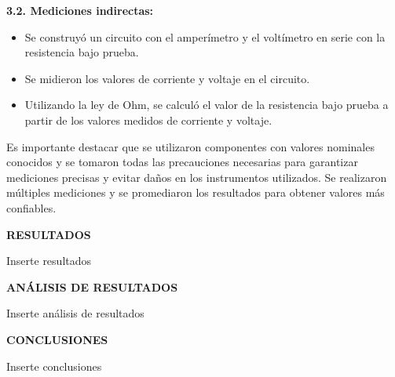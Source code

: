 \documentclass[12pt]{article}
\begin{document}
\begin{enumerate}
		\textbf{3.2. Mediciones indirectas:}
		
		\begin{itemize}
			\item Se construyó un circuito con el amperímetro y el voltímetro en serie con la resistencia bajo prueba.
			\item Se midieron los valores de corriente y voltaje en el circuito.
			\item Utilizando la ley de Ohm, se calculó el valor de la resistencia bajo prueba a partir de los valores medidos de corriente y voltaje.
		\end{itemize}
		
	\end{enumerate}
	
	Es importante destacar que se utilizaron componentes con valores nominales conocidos y se tomaron todas las precauciones necesarias para garantizar mediciones precisas y evitar daños en los instrumentos utilizados. Se realizaron múltiples mediciones y se promediaron los resultados para obtener valores más confiables.

	\newpage
	
	\begin{center}
		\textbf{\large RESULTADOS}\\
	\end{center}
	
	Inserte resultados
	
	\newpage
	
	\begin{center}
		\textbf{\large ANÁLISIS DE RESULTADOS}\\
	\end{center}
	
	Inserte análisis de resultados
	
	\newpage
	
	\begin{center}
		\textbf{\large CONCLUSIONES}\\
	\end{center}
	
	Inserte conclusiones
	
	\newpage
	
\end{document}
